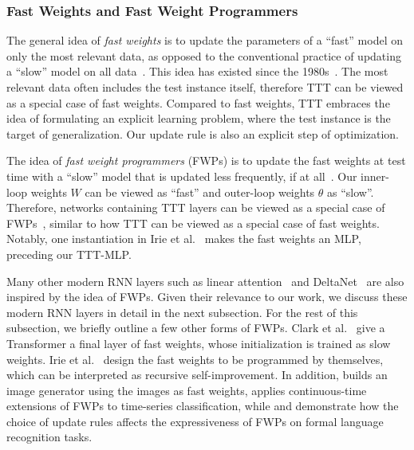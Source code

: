 \documentclass{article}
\begin{document}
\subsubsection{Fast Weights and Fast Weight Programmers}
\label{subsubsec:fw}

The general idea of \emph{fast weights} is to update the parameters of a ``fast'' model on only the most relevant data, as opposed to the conventional practice of updating a ``slow'' model on all data~\cite{tieleman2009using}.
This idea has existed since the 1980s~\cite{feldman1982dynamic, hinton1987using, von1994correlation}.
The most relevant data often includes the test instance itself, therefore TTT can be viewed as a special case of fast weights.
Compared to fast weights, TTT embraces the idea of formulating an explicit learning problem, where the test instance is the target of generalization.
Our update rule is also an explicit step of optimization.

The idea of \emph{fast weight programmers} (FWPs) is to update the fast weights at test time with a ``slow'' model that is updated less frequently, if at all~\cite{schmidhuber1992learning}.
Our inner-loop weights $W$ can be viewed as ``fast'' and outer-loop weights $\theta$ as ``slow''.
Therefore, networks containing TTT layers can be viewed as a special case of FWPs~\cite{kirsch2021meta}, similar to how TTT can be viewed as a special case of fast weights.
Notably, one instantiation in Irie et al.~\cite{irie2021going} makes the fast weights an MLP, preceding our TTT-MLP. 

Many other modern RNN layers such as linear attention~\cite{katharopoulos2020transformers, schlag2020learning} and DeltaNet~\cite{schlag2021linear, yang2024parallelizing} are also inspired by the idea of FWPs.
Given their relevance to our work, we discuss these modern RNN layers in detail in the next subsection.
For the rest of this subsection, we briefly outline a few other forms of FWPs.
Clark et al.~\cite{clark2022meta} give a Transformer a final layer of fast weights, whose initialization is trained as slow weights.
Irie et al.~\cite{irie2022modern} design the fast weights to be programmed by themselves, which can be interpreted as recursive self-improvement.
In addition,
\cite{irie2022images} builds an image generator using the images as fast weights,
\cite{irie2022neural} applies continuous-time extensions of FWPs to time-series classification,
while 
\cite{irie2023practical} and \cite{grazzi2024unlocking} demonstrate how the choice of update rules affects the expressiveness of FWPs on formal language recognition tasks.
\end{document}
